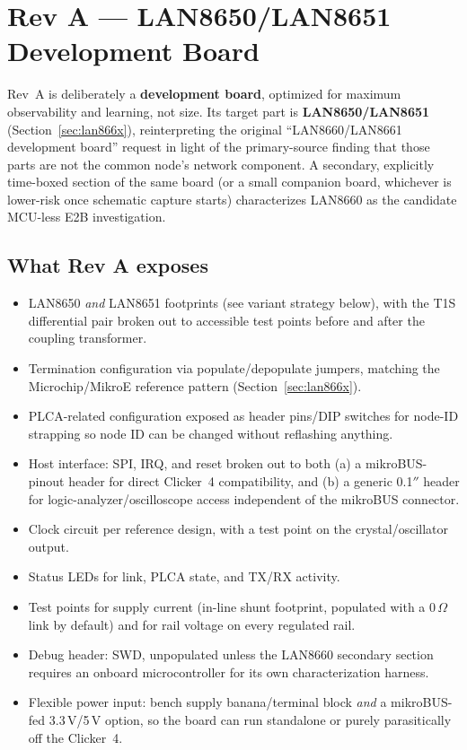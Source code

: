 \section{Rev A --- LAN8650/LAN8651 Development Board}
\label{sec:rev-a}

Rev~A is deliberately a \textbf{development board}, optimized for maximum observability and learning, not size. Its target part is \textbf{LAN8650/LAN8651} (Section~\ref{sec:lan866x}), reinterpreting the original ``LAN8660/LAN8661 development board'' request in light of the primary-source finding that those parts are not the common node's network component. A secondary, explicitly time-boxed section of the same board (or a small companion board, whichever is lower-risk once schematic capture starts) characterizes LAN8660 as the candidate MCU-less E2B investigation.

\subsection{What Rev A exposes}

\begin{itemize}[itemsep=0.1em]
\item LAN8650 \emph{and} LAN8651 footprints (see variant strategy below), with the T1S differential pair broken out to accessible test points before and after the coupling transformer.
\item Termination configuration via populate/depopulate jumpers, matching the Microchip/MikroE reference pattern (Section~\ref{sec:lan866x}).
\item PLCA-related configuration exposed as header pins/DIP switches for node-ID strapping so node ID can be changed without reflashing anything.
\item Host interface: SPI, IRQ, and reset broken out to both (a) a mikroBUS-pinout header for direct Clicker~4 compatibility, and (b) a generic 0.1$''$ header for logic-analyzer/oscilloscope access independent of the mikroBUS connector.
\item Clock circuit per reference design, with a test point on the crystal/oscillator output.
\item Status LEDs for link, PLCA state, and TX/RX activity.
\item Test points for supply current (in-line shunt footprint, populated with a 0\,$\Omega$ link by default) and for rail voltage on every regulated rail.
\item Debug header: SWD, unpopulated unless the LAN8660 secondary section requires an onboard microcontroller for its own characterization harness.
\item Flexible power input: bench supply banana/terminal block \emph{and} a mikroBUS-fed 3.3\,V/5\,V option, so the board can run standalone or purely parasitically off the Clicker~4.
\end{itemize}

